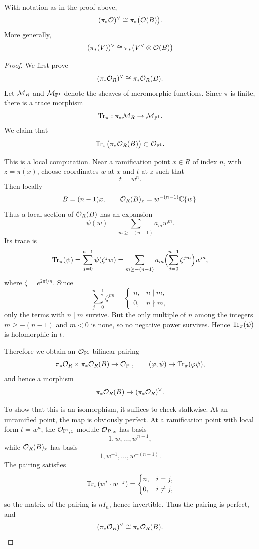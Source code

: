 \documentclass[12pt]{article}
\begin{document}
\begin{lemma}\label{lem:twisted-dual-direct-image}
    With notation as in the proof above,
    \[
        (\pi_* {\mathcal{O}})^\vee \cong \pi_* \big({\mathcal{O}}(B)\big).
    \]
    More generally,
    \[
        (\pi_* (V))^\vee \cong \pi_* \bigl(V^\vee \otimes {\mathcal{O}}(B)\bigr)
    \]
\end{lemma}\begin{proof}
    We first prove
    \[
        (\pi_*{\mathcal{O}}_R)^\vee \cong \pi_*{\mathcal{O}}_R(B).
    \]
    Let \({\mathcal{M}}_R\) and \({\mathcal{M}}_{\mathbb{P}^1}\) denote the sheaves of meromorphic functions. Since
    \(\pi\) is finite, there is a trace morphism
    \[
        \operatorname{Tr}_\pi:\pi_*{\mathcal{M}}_R \to {\mathcal{M}}_{\mathbb{P}^1}.
    \]
    We claim that
    \[
        \operatorname{Tr}_\pi\bigl(\pi_*{\mathcal{O}}_R(B)\bigr)\subset {\mathcal{O}}_{\mathbb{P}^1}.
    \]

    This is a local computation. Near a ramification point \(x\in R\) of index \(n\), with
    \(z=\pi(x)\), choose coordinates \(w\) at \(x\) and \(t\) at \(z\) such that
    \[
        t=w^n.
    \]
    Then locally
    \[
        B=(n-1)x,
        \qquad
        {\mathcal{O}}_R(B)_x = w^{-(n-1)}\mathbb{C}\{w\}.
    \]
    Thus a local section of \({\mathcal{O}}_R(B)\) has an expansion
    \[
        \psi(w)=\sum_{m\ge -(n-1)} a_m w^m.
    \]
    Its trace is
    \[
        \operatorname{Tr}_\pi(\psi)=\sum_{j=0}^{n-1}\psi(\zeta^j w)
        =\sum_{m\ge -(n-1)} a_m \Bigl(\sum_{j=0}^{n-1}\zeta^{jm}\Bigr) w^m,
    \]
    where \(\zeta=e^{2\pi i/n}\). Since
    \[
        \sum_{j=0}^{n-1}\zeta^{jm}=
        \begin{cases}
            n, & n\mid m,  \\
            0, & n\nmid m,
        \end{cases}
    \]
    only the terms with \(n\mid m\) survive. But the only multiple of \(n\) among the integers
    \(m\ge -(n-1)\) and \(m<0\) is none, so no negative power survives. Hence
    \(\operatorname{Tr}_\pi(\psi)\) is holomorphic in \(t\).

    Therefore we obtain an \({\mathcal{O}}_{\mathbb{P}^1}\)-bilinear pairing
    \[
        \pi_*{\mathcal{O}}_R \times \pi_*{\mathcal{O}}_R(B)\to {\mathcal{O}}_{\mathbb{P}^1},
        \qquad
        (\varphi,\psi)\mapsto \operatorname{Tr}_\pi(\varphi\psi),
    \]
    and hence a morphism
    \[
        \pi_*{\mathcal{O}}_R(B)\to (\pi_*{\mathcal{O}}_R)^\vee.
    \]

    To show that this is an isomorphism, it suffices to check stalkwise. At an unramified point,
    the map is obviously perfect. At a ramification point with local form \(t=w^n\), the
    \({\mathcal{O}}_{\mathbb{P}^1,z}\)-module \({\mathcal{O}}_{R,x}\) has basis
    \[
        1,w,\dots,w^{n-1},
    \]
    while \({\mathcal{O}}_R(B)_x\) has basis
    \[
        1,w^{-1},\dots,w^{-(n-1)}.
    \]
    The pairing satisfies
    \[
        \operatorname{Tr}_\pi(w^i\cdot w^{-j})=
        \begin{cases}
            n, & i=j,     \\
            0, & i\neq j,
        \end{cases}
    \]
    so the matrix of the pairing is \(nI_n\), hence invertible. Thus the pairing is perfect, and
    \[
        (\pi_*{\mathcal{O}}_R)^\vee \cong \pi_*{\mathcal{O}}_R(B).
    \]


\end{proof}
\end{document}
